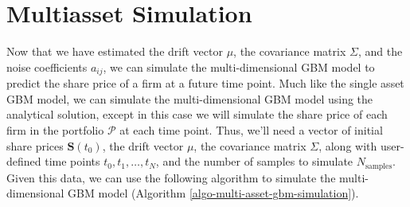 \documentclass[11pt]{article}
\theoremstyle{definition}
\begin{document}
\section*{Multiasset Simulation}
Now that we have estimated the drift vector $\mu$, the covariance matrix $\Sigma$, and the noise coefficients $a_{ij}$, we can
simulate the multi-dimensional GBM model to predict the share price of a firm at a future time point. 
Much like the single asset GBM model, we can simulate the multi-dimensional GBM model using the analytical solution, 
except in this case we will simulate the share price of each firm in the portfolio $\mathcal{P}$ at each time point.
Thus, we'll need a vector of initial share prices $\mathbf{S}(t_{0})$, the drift vector $\mu$, the covariance matrix $\Sigma$,
along with user-defined time points $t_{0},t_{1},\dots,t_{N}$, and the number of samples to simulate $N_{\text{samples}}$.
Given this data, we can use the following algorithm to simulate the multi-dimensional GBM model (Algorithm \ref{algo-multi-asset-gbm-simulation}).
\end{document}
